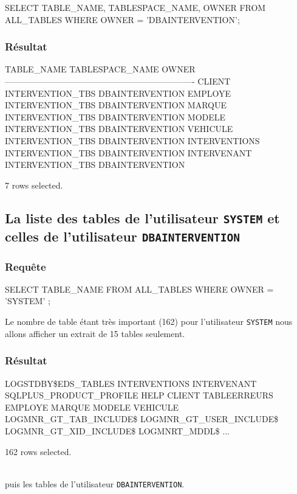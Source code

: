 \documentclass[•]{article}
\begin{document}
\begin{sql}
SELECT TABLE_NAME, TABLESPACE_NAME, OWNER 
FROM ALL_TABLES 
WHERE OWNER = 'DBAINTERVENTION';
\end{sql}

\subsubsection{Résultat}
\begin{sql}
TABLE_NAME                     TABLESPACE_NAME				OWNER 
-------------------------------------------------------------------
CLIENT                         INTERVENTION_TBS				DBAINTERVENTION
EMPLOYE                        INTERVENTION_TBS				DBAINTERVENTION
MARQUE                         INTERVENTION_TBS				DBAINTERVENTION
MODELE                         INTERVENTION_TBS				DBAINTERVENTION
VEHICULE                       INTERVENTION_TBS				DBAINTERVENTION
INTERVENTIONS                  INTERVENTION_TBS				DBAINTERVENTION
INTERVENANT                    INTERVENTION_TBS				DBAINTERVENTION

7 rows selected.
\end{sql}

\subsection{La liste des tables de l'utilisateur \texttt{SYSTEM} et celles de l'utilisateur \texttt{DBAINTERVENTION}}
\subsubsection{Requête}
\begin{sql}
SELECT TABLE_NAME  FROM ALL_TABLES WHERE OWNER = 'SYSTEM' ;
\end{sql}

Le nombre de table étant très important (162) pour l'utilisateur \texttt{SYSTEM} nous allons afficher un extrait de 15 tables seulement.

\subsubsection{Résultat}
\begin{sql}
LOGSTDBY\$EDS_TABLES
INTERVENTIONS
INTERVENANT
SQLPLUS_PRODUCT_PROFILE
HELP
CLIENT
TABLEERREURS
EMPLOYE
MARQUE
MODELE
VEHICULE
LOGMNR_GT_TAB_INCLUDE\$
LOGMNR_GT_USER_INCLUDE\$
LOGMNR_GT_XID_INCLUDE\$
LOGMNRT_MDDL\$
...

162 rows selected.
\end{sql}
\textrm{ }
\\
puis les tables de l'utilisateur \texttt{DBAINTERVENTION}.
\end{document}
